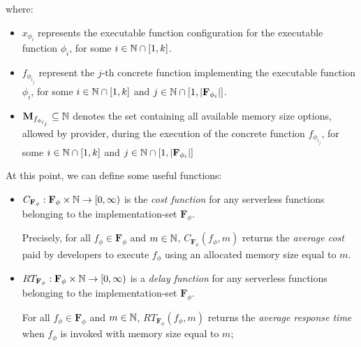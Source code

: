 where:

\begin{itemize}
\item $x_{\phi_{i}}$ represents the executable function configuration for the executable function $\phi_{i}$, for some  $i \in \mathbb{N} \cap \left[ 1, k \right]$.

\item $f_{\phi_{i_j}}$ represent the $j$-th concrete function implementing the executable function $\phi_{i}$, for some  $i \in \mathbb{N} \cap \left[ 1, k \right]$ and $j \in \mathbb{N} \cap \left[ 1, |\textbf{F}_{\phi_{i}}| \right]$.

\item $\textbf{M}_{f_{\phi_{i_j}}} \subseteq \mathbb{N}$ denotes the set containing all available memory size options, allowed by provider, during the execution of the concrete function $f_{\phi_{i_j}}$, for some $i \in \mathbb{N} \cap \left[ 1, k \right]$ and $j \in \mathbb{N} \cap \left[ 1, |\textbf{F}_{\phi_{i}}| \right]$
\end{itemize}
















At this point, we can define some useful functions:

\begin{itemize}	
	\item $C_{\textbf{F}_{\phi}} : \textbf{F}_{\phi} \times \mathbb{N} \to \left[ 0, \infty \right)$ is the \textit{cost function} for any serverless functions belonging to the implementation-set $\textbf{F}_{\phi}$.
	
	Precisely, for all $f_{\phi} \in \textbf{F}_{\phi}$ and $m \in \mathbb{N}$, $C_{\textbf{F}_{\phi}}(f_{\phi}, m)$ returns the \textit{average cost} paid by developers to execute $f_{\phi}$ using an allocated memory size equal to $m$.
	
	
	\item $RT_{\textbf{F}_{\phi}} : \textbf{F}_{\phi} \times \mathbb{N} \to \left[ 0, \infty \right)$ is a \textit{delay function} for any serverless functions belonging to the implementation-set $\textbf{F}_{\phi}$.
	
	For all $f_{\phi} \in \textbf{F}_{\phi}$ and $m \in \mathbb{N}$, $RT_{\textbf{F}_{\phi}}(f_{\phi}, m)$ returns the \textit{average response time} when $f_{\phi}$ is invoked with memory size equal to $m$;
\end{itemize}






